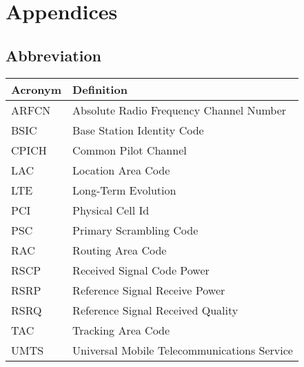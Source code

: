 \chapter{Appendices}
\clearpage
\section{Abbreviation}
\begin{longtable}{lp{24cm}}
\rowcolor{Plum!20}
Acronym & Definition \\\toprule
ARFCN & Absolute Radio Frequency Channel Number \\
BSIC & Base Station Identity Code\\
CPICH & Common Pilot Channel \\
LAC & Location Area Code \\
LTE & Long-Term Evolution\\
PCI & Physical Cell Id\\
PSC & Primary Scrambling Code\\
RAC & Routing Area Code \\
RSCP & Received Signal Code Power\\
RSRP & Reference Signal Receive Power\\
RSRQ & Reference Signal Received Quality\\
TAC & Tracking Area Code \\
UMTS & Universal Mobile Telecommunications Service \\
\bottomrule
\end{longtable}